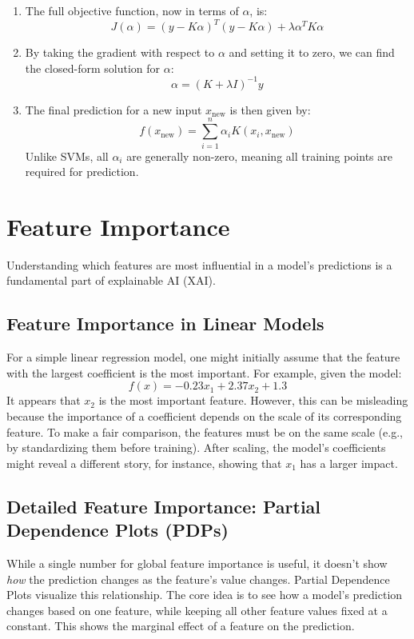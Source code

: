 \documentclass{article}
\begin{document}
\begin{multicols}{2}
\begin{enumerate}
    \item The full objective function, now in terms of $\alpha$, is:
    \[
    J(\alpha) = (y - K\alpha)^T (y - K\alpha) + \lambda \alpha^T K \alpha
    \]
    
    \item By taking the gradient with respect to $\alpha$ and setting it to zero, we can find the closed-form solution for $\alpha$:
    \[
    \alpha = (K+\lambda I)^{-1}y
    \]
    
    \item The final prediction for a new input $x_{\text{new}}$ is then given by:
    \[
    f(x_{\text{new}}) = \sum_{i=1}^n \alpha_i K(x_i, x_{\text{new}})
    \]
    Unlike SVMs, all $\alpha_i$ are generally non-zero, meaning all training points are required for prediction.
\end{enumerate}

\section{Feature Importance}
Understanding which features are most influential in a model's predictions is a fundamental part of explainable AI (XAI).

\subsection{Feature Importance in Linear Models}
For a simple linear regression model, one might initially assume that the feature with the largest coefficient is the most important. For example, given the model:
$$ f(x) = -0.23x_{1} + 2.37x_{2} + 1.3 $$
It appears that $x_2$ is the most important feature. However, this can be misleading because the importance of a coefficient depends on the scale of its corresponding feature. To make a fair comparison, the features must be on the same scale (e.g., by standardizing them before training). After scaling, the model's coefficients might reveal a different story, for instance, showing that $x_1$ has a larger impact.

\subsection{Detailed Feature Importance: Partial Dependence Plots (PDPs)}
While a single number for global feature importance is useful, it doesn't show \textit{how} the prediction changes as the feature's value changes. Partial Dependence Plots visualize this relationship. The core idea is to see how a model's prediction changes based on one feature, while keeping all other feature values fixed at a constant. This shows the marginal effect of a feature on the prediction.


\end{multicols}
\end{document}
